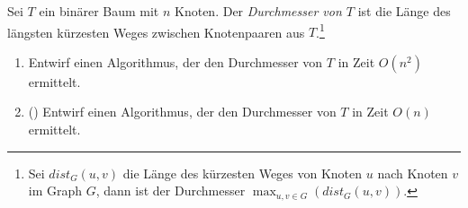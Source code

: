 \documentclass{uebung_cs}
\begin{document}
\begin{aufgabe}
	Sei $T$ ein binärer Baum mit $n$ Knoten.
	Der \textit{Durchmesser von $T$} ist die Länge des längsten kürzesten Weges zwischen Knotenpaaren aus $T$.\footnote{Sei $dist_G(u,v)$ die Länge des kürzesten Weges von Knoten $u$ nach Knoten $v$ im Graph $G$, dann ist der Durchmesser $\max_{u,v\in G}( dist_G(u,v) )$.}
	\begin{enumerate}
		\item \mittel Entwirf einen Algorithmus, der den Durchmesser von $T$ in Zeit $O(n^2)$ ermittelt.
		\item \note (\veryhard) Entwirf einen Algorithmus, der den Durchmesser von $T$ in Zeit $O(n)$ ermittelt.
	\end{enumerate}
\end{aufgabe}
\end{document}
